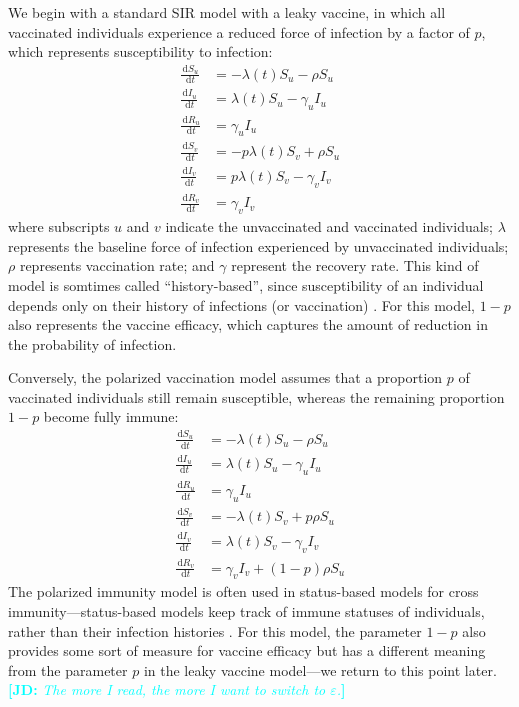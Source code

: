 \documentclass[12pt]{article}
\newcommand{\comment}{\showcomment}
\newcommand{\showcomment}[3]{\textcolor{#1}{\textbf{[#2: }\textsl{#3}\textbf{]}}}
\newcommand{\jd}[1]{\comment{cyan}{JD}{#1}}
\newcommand{\dd}[1]{\ensuremath{\, \mathrm{d}#1}}
\begin{document}
We begin with a standard SIR model with a leaky vaccine, in which all vaccinated individuals experience a reduced force of infection by a factor of $p$, which represents susceptibility to infection:
\begin{align}
\frac{\dd S_u}{\dd t} &= - \lambda(t) S_u - \rho S_u \\
\frac{\dd I_u}{\dd t} &= \lambda(t) S_u - \gamma_u I_u \\
\frac{\dd R_u}{\dd t} &= \gamma_u I_u \\
\frac{\dd S_v}{\dd t} &= - p \lambda(t) S_v + \rho S_u \\
\frac{\dd I_v}{\dd t} &= p \lambda(t) S_v - \gamma_v I_v \\
\frac{\dd R_v}{\dd t} &= \gamma_v I_v
\end{align}
where subscripts $u$ and $v$ indicate the unvaccinated and vaccinated individuals;
$\lambda$ represents the baseline force of infection experienced by unvaccinated individuals; 
$\rho$ represents vaccination rate;
and $\gamma$ represent the recovery rate.
This kind of model is somtimes called “history-based”, since susceptibility of an individual depends only on their history of infections (or vaccination) \citep{gog2002dynamics,gog2002status,kucharski2016capturing}.
For this model, $1-p$ also represents the vaccine efficacy, which captures the amount of reduction in the probability of infection.

Conversely, the polarized vaccination model assumes that a proportion $p$ of vaccinated individuals still remain susceptible, whereas the remaining proportion $1-p$ become fully immune: 
\begin{align}
\frac{\dd S_u}{\dd t} &= - \lambda(t) S_u - \rho S_u \\
\frac{\dd I_u}{\dd t} &= \lambda(t) S_u - \gamma_u I_u \\
\frac{\dd R_u}{\dd t} &= \gamma_u I_u \\
\frac{\dd S_v}{\dd t} &= - \lambda(t) S_v + p \rho S_u \\
\frac{\dd I_v}{\dd t} &= \lambda(t) S_v - \gamma_v I_v \\
\frac{\dd R_v}{\dd t} &= \gamma_v I_v + (1-p) \rho S_u
\end{align}
The polarized immunity model is often used in status-based models for cross immunity---status-based models keep track of immune statuses of individuals, rather than their infection histories \citep{gog2002dynamics,gog2002status,kucharski2016capturing}.
For this model, the parameter $1-p$ also provides some sort of measure for vaccine efficacy but has a different meaning from the parameter $p$ in the leaky vaccine model---we return to this point later.
\jd{The more I read, the more I want to switch to $\varepsilon$.}
\end{document}
